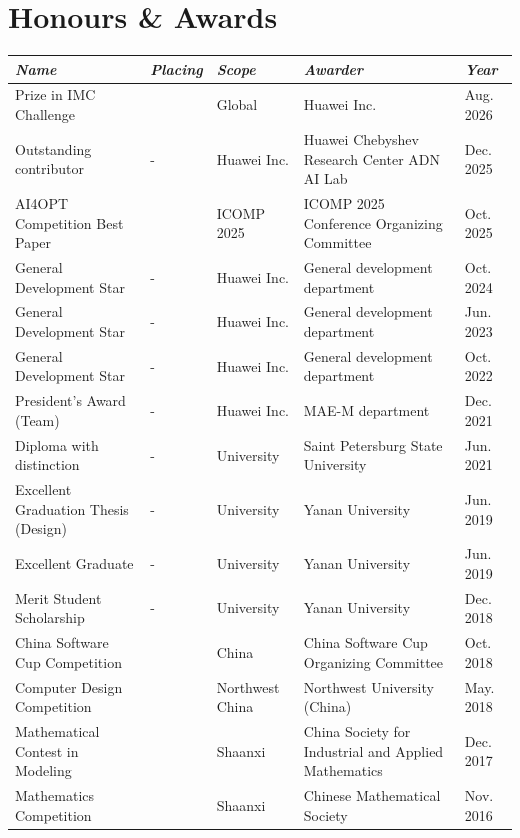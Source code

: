 \documentclass[letterpaper,10pt]{article}
\makeatletter
\newcommand{\awardsTable}[1]{
  \begin{tabularx}{\textwidth}{l @{\extracolsep{\fill}} *{4}{l}}
	\emph{Name}	& \emph{Placing}	& \emph{Scope}	& \emph{Awarder} & \emph{Year}       \\
	\midrule\midrule
	#1
	\end{tabularx}
}
\newcommand{\awardsTableRow}[6]{
	\BeginAccSupp{method=plain, ActualText=11\string\t 21}#1 & #2 & #3 & #4 & #5\EndAccSupp{} \\
}
\makeatother
\begin{document}
\section{Honours \& Awards}
\setlength{\tabcolsep}{6.0pt}
\renewcommand{\arraystretch}{1.1}
\fontsize{8.5}{11}\selectfont
\awardsTable{
  \awardsTableRow{\nth{3} Prize in \nth{2} IMC Challenge}{\nth{3}}{Global}{Huawei Inc.}{Aug. 2026} \\
  \awardsTableRow{Outstanding contributor}{-}{Huawei Inc.}{Huawei Chebyshev
                  Research Center ADN AI Lab}{Dec. 2025} \\
  \awardsTableRow{AI4OPT Competition Best Paper}{\nth{1}}{ICOMP 2025}{ICOMP
                  2025 Conference Organizing Committee}{Oct. 2025} \\
  \awardsTableRow{General Development Star}{-}{Huawei Inc.}{General development
                  department}{Oct. 2024} \\
  \awardsTableRow{General Development Star}{-}{Huawei Inc.}{General development
                  department}{Jun. 2023} \\
  \awardsTableRow{General Development Star}{-}{Huawei Inc.}{General development
                  department}{Oct. 2022} \\
  \awardsTableRow{President's Award (Team)}{-}{Huawei Inc.}{MAE-M
                  department}{Dec. 2021} \\
  \awardsTableRow{Diploma with distinction}{-}{University}{Saint Petersburg
                  State University}{Jun. 2021} \\
  \awardsTableRow{Excellent Graduation Thesis (Design)}{-}{University}{Yanan
                  University}{Jun. 2019} \\
  \awardsTableRow{Excellent Graduate}{-}{University}{Yanan University}{Jun.
                  2019} \\
  \awardsTableRow{Merit Student Scholarship}{-}{University}{Yanan
                  University}{Dec. 2018} \\
  \awardsTableRow{China Software Cup Competition}{\nth{3}}{China}{China
                  Software Cup Organizing Committee}{Oct. 2018} \\
  \awardsTableRow{Computer Design Competition}{\nth{3}}{Northwest
                  China}{Northwest University (China)}{May. 2018} \\
  \awardsTableRow{Mathematical Contest in Modeling}{\nth{2}}{Shaanxi}{China
                  Society for Industrial and Applied Mathematics}{Dec. 2017} \\
  \awardsTableRow{Mathematics Competition}{\nth{3}}{Shaanxi}{Chinese
                  Mathematical Society}{Nov. 2016} \\ \hline }
\end{document}

